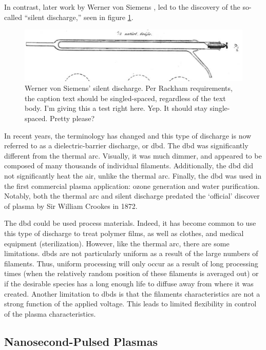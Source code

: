 In contrast, later work by Werner von Siemens \cite{Siemens1857}, led to the
discovery of the so-called ``silent discharge,'' seen in figure
\ref{fig:siemens}.
\begin{figure}\label{fig:siemens}
  \centering
  \includegraphics[scale=0.5]{chapters/introduction/figures/siemens.png}
  \caption{Werner von Siemens' silent discharge. Per Rackham requirements, the
caption text should be singled-spaced, regardless of the text body. I'm giving
this a test right here. Yep. It should stay single-spaced. Pretty please?}
\end{figure}
In recent years, the terminology has changed and this type of
discharge is now referred to as a dielectric-barrier discharge, or \acs{dbd}.
The \acs{dbd} was significantly different from the thermal arc. Visually, it was
much dimmer, and appeared to be composed of many thousands of individual
filaments. Additionally, the \acs{dbd} did not significantly heat the air,
unlike the thermal arc. Finally, the \acs{dbd} was used in the first commercial
plasma application: ozone generation and water purification. Notably, both the
thermal arc and silent discharge predated the `official' discover of plasma by
Sir William Crookes in 1872.

The \acs{dbd} could be used process materials. Indeed, it has become common to
use this type of discharge to treat polymer films, as well as clothes, and
medical equipment (sterilization). However, like the thermal arc, there are some
limitations. \acs{dbd}s are not particularly uniform as a result of the large
numbers of filaments. Thus, uniform processing will only occur as a result of
long processing times (when the relatively random position of these filaments is
averaged out) or if the desirable species has a long enough life to diffuse away
from where it was created. Another limitation to \acs{dbd}s is that the
filaments characteristics are not a strong function of the applied voltage. This
leads to limited flexibility in control of the plasma characteristics.

\subsection{Nanosecond-Pulsed Plasmas}


